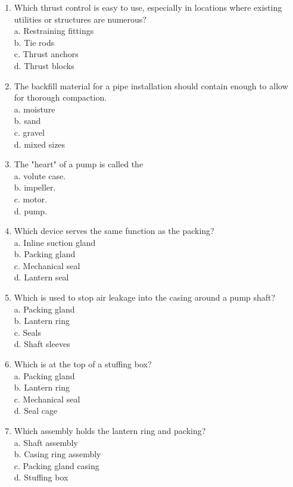 \documentclass[10pt]{article}
\begin{document}
\begin{enumerate}
  \item Which thrust control is easy to use, especially in locations where existing utilities or structures are numerous?\\
a. Restraining fittings\\
b. Tie rods\\
c. Thrust anchors\\
d. Thrust blocks

  \item The backfill material for a pipe installation should contain enough to allow for thorough compaction.\\
a. moisture\\
b. sand\\
c. gravel\\
d. mixed sizes

  \item The "heart" of a pump is called the\\
a. volute case.\\
b. impeller.\\
c. motor.\\
d. pump.

  \item Which device serves the same function as the packing?\\
a. Inline suction gland\\
b. Packing gland\\
c. Mechanical seal\\
d. Lantern seal

  \item Which is used to stop air leakage into the casing around a pump shaft?\\
a. Packing gland\\
b. Lantern ring\\
c. Seals\\
d. Shaft sleeves

  \item Which is at the top of a stuffing box?\\
a. Packing gland\\
b. Lantern ring\\
c. Mechanical seal\\
d. Seal cage 

	\item Which assembly holds the lantern ring and packing?\\
a. Shaft assembly\\
b. Casing ring assembly\\
c. Packing gland casing\\
d. Stuffing box


\end{enumerate}
\end{document}
